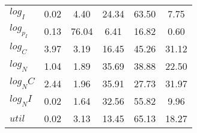 \begin{center}
\begin{longtable}{lccccc}
$log_I     $	 & 	        0.02	 & 	        4.40	 & 	       24.34	 & 	       63.50	 & 	        7.75 \\ 
$log_p_I   $	 & 	        0.13	 & 	       76.04	 & 	        6.41	 & 	       16.82	 & 	        0.60 \\ 
$log_C     $	 & 	        3.97	 & 	        3.19	 & 	       16.45	 & 	       45.26	 & 	       31.12 \\ 
$log_N     $	 & 	        1.04	 & 	        1.89	 & 	       35.69	 & 	       38.88	 & 	       22.50 \\ 
$log_NC    $	 & 	        2.44	 & 	        1.96	 & 	       35.91	 & 	       27.73	 & 	       31.97 \\ 
$log_NI    $	 & 	        0.02	 & 	        1.64	 & 	       32.56	 & 	       55.82	 & 	        9.96 \\ 
$util      $	 & 	        0.02	 & 	        3.13	 & 	       13.45	 & 	       65.13	 & 	       18.27 \\ 
\end{longtable}
 \end{center}
